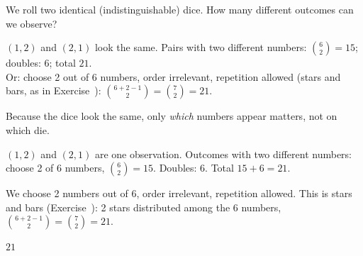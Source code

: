 
\begin{problem}
	We roll two identical (indistinguishable) dice. How many different outcomes
	can we observe?
\end{problem}

\begin{slides}
	\small
	\exstatement
	\pause
	\sol
	$(1,2)$ and $(2,1)$ look the same. Pairs with two different numbers:
	$\binom62=15$; doubles: $6$; total $21$.\\[1mm]
	Or: choose 2 out of 6 numbers, order irrelevant, repetition allowed (stars
	and bars, as in Exercise~):
	$\binom{6+2-1}{2}=\binom72 = 21$.
\end{slides}

\begin{solution}
	\idea Because the dice look the same, only \emph{which} numbers appear
	matters, not on which die.

	 $(1,2)$ and $(2,1)$ are one observation. Outcomes with two
	different numbers: choose 2 of 6 numbers, $\binom62=15$. Doubles: $6$.
	Total $15+6=21$.

	 We choose 2 numbers out of 6, order irrelevant,
	repetition allowed. This is stars and bars (Exercise~):
	2 stars distributed among the 6 numbers, $\binom{6+2-1}{2}=\binom72=21$.
	\begin{answer}
		$21$
	\end{answer}
\end{solution}
